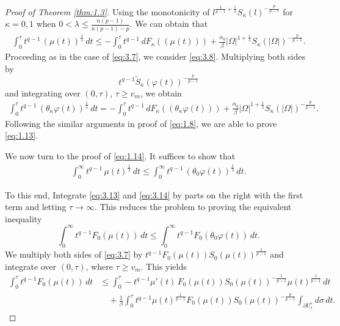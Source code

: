 \documentclass[10pt,a4paper]{amsart}
\begin{document}
\begin{proof}[Proof of Theorem \ref{thm:1.3}]
Using the monotonicity of $l^{\frac{1}{p-1}+\frac{1}{\lambda}}S_\kappa(l)^{-\frac{p}{p-1}}$ for $\kappa=0,1$ when $0 < \lambda\le \frac{n(p-1)}{n(p-1)-p}$. We can obtain that
\begin{align}\label{eq:3.13}
\int_0^\tau t^{q-1}\,(\mu(t))^{\frac{1}{\lambda}}\,dt
\le
-\int_0^\tau t^{q-1}\,dF_\kappa((\mu(t)))
+\frac{\alpha_q}{\beta}
|\Omega|^{1+\frac{1}{\lambda}}S_\kappa(|\Omega|)^{-\frac{p}{p-1}}.
\end{align}
Proceeding as in the case of \eqref{eq:3.7}, we consider \eqref{eq:3.8}. Multiplying both sides by
\[
t^{q-1}\tilde{S}_\kappa(\varphi(t))^{-\frac{p}{p-1}}
\]
and integrating over $(0,\tau)$, $\tau \ge v_m$, we obtain
\begin{align}\label{eq:3.14}
\int_0^\tau t^{q-1}\,(\theta_\kappa\varphi(t))^{\frac{1}{\lambda}}\,dt
=
-\int_0^\tau t^{q-1}\,dF_\kappa((\theta_\kappa\varphi(t)))
+\frac{\alpha_q}{\beta}
|\Omega|^{1+\frac{1}{\lambda}}S_\kappa(|\Omega|)^{-\frac{p}{p-1}}.
\end{align}
Following the similar arguments in proof of \eqref{eq:1.8}, we are able to prove \eqref{eq:1.13}.
\par
We now turn to the proof of \eqref{eq:1.14}. It suffices to show that
\begin{align*}
\int_0^\infty t^{q-1}\,\mu(t)^{\frac{1}{\lambda}}\,dt
\le
\int_0^\infty t^{q-1}\,(\theta_0\varphi(t))^{\frac{1}{\lambda}}\,dt.
\end{align*}

To this end, Integrate \eqref{eq:3.13} and \eqref{eq:3.14} by parts on the right with the first term and letting $\tau\to\infty$. This reduces the problem to proving the equivalent inequality
\[
\int_0^\infty t^{q-1}F_0(\mu(t))\,dt
\le
\int_0^\infty t^{q-1}F_0(\theta_0 \varphi(t))\,dt.
\]
We multiply both sides of \eqref{eq:3.7} by
$t^{q-1} F_0(\mu(t)) S_0(\mu(t))^{\frac{1}{p-1}}$
and integrate over $(0,\tau)$, where $\tau \ge v_m$. This yields
\begin{align*}
\int_0^\tau t^{q-1} F_0(\mu(t))\,dt
&\le
\int_0^\tau -t^{q-1}\mu'(t)\, F_0(\mu(t)) S_0(\mu(t))^{-\frac{1}{p-1}}
\mu(t)^{\frac{1}{p-1}}\,dt \\
&\quad +
\frac{1}{\beta}
\int_0^\tau t^{q-1}\mu(t)^{\frac{1}{p-1}} F_0(\mu(t))
S_0(\mu(t))^{-\frac{p}{p-1}}
\int_{\partial U_t^e} d\sigma\, dt.
\end{align*}


\end{proof}
\end{document}
